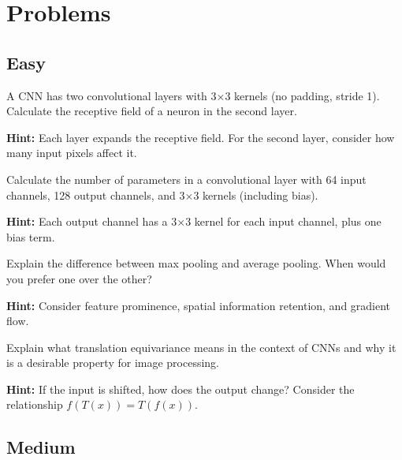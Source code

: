 
\section*{Problems}

\subsection*{Easy}

\begin{problem}
A CNN has two convolutional layers with 3×3 kernels (no padding, stride 1). Calculate the receptive field of a neuron in the second layer.

\textbf{Hint:} Each layer expands the receptive field. For the second layer, consider how many input pixels affect it.
\end{problem}

\begin{problem}
Calculate the number of parameters in a convolutional layer with 64 input channels, 128 output channels, and 3×3 kernels (including bias).

\textbf{Hint:} Each output channel has a 3×3 kernel for each input channel, plus one bias term.
\end{problem}

\begin{problem}
Explain the difference between max pooling and average pooling. When would you prefer one over the other?

\textbf{Hint:} Consider feature prominence, spatial information retention, and gradient flow.
\end{problem}

\begin{problem}
Explain what translation equivariance means in the context of CNNs and why it is a desirable property for image processing.

\textbf{Hint:} If the input is shifted, how does the output change? Consider the relationship $f(T(x)) = T(f(x))$.
\end{problem}

\subsection*{Medium}

